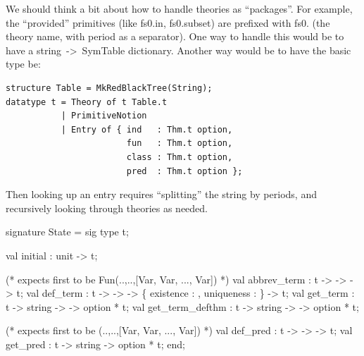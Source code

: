\begin{node}
We should think a bit about how to handle theories as
``packages''. For example, the ``provided'' primitives (like
{\Tt{}fs0.in\nwendquote}, {\Tt{}fs0.subset\nwendquote}) are prefixed with {\Tt{}fs0.\nwendquote} (the theory
name, with period as a separator). One way to handle this would be to
have a {\Tt{}string\ ->\ SymTable\nwendquote} dictionary. Another way would be to have
the basic type be:
\begin{verbatim}
structure Table = MkRedBlackTree(String);
datatype t = Theory of t Table.t
           | PrimitiveNotion
           | Entry of { ind   : Thm.t option, 
                        fun   : Thm.t option,
                        class : Thm.t option,
                        pred  : Thm.t option };
\end{verbatim}
Then looking up an entry requires ``splitting'' the string by periods,
and recursively looking through theories as needed.
\end{node}

\nwenddocs{}\endmoddef\nwstartdeflinemarkup\nwenddeflinemarkup
signature State = sig
  type t;

  val initial : unit -> t;

  (* expects first  to be Fun(..,..,[Var, Var, ..., Var]) *)
  val abbrev_term : t ->  ->  -> t;
  val def_term : t ->  ->  -> \{ existence : ,
                                              uniqueness : \} -> t;
  val get_term : t -> string ->  ->  option * t;
  val get_term_defthm : t -> string ->  ->  option * t;
  
  (* expects first  to be (..,..,[Var, Var, ..., Var]) *)
  val def_pred : t ->  ->  -> t;
  val get_pred : t -> string ->  option * t;
end;
\nwendcode{}\nwdocspar

